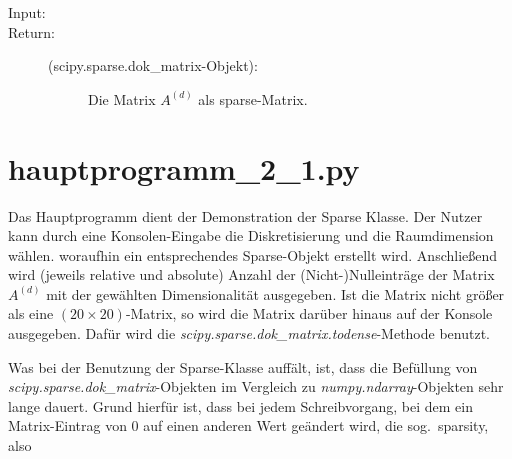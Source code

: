 \documentclass[a4paper,10pt,ngerman, openright]{sphinxmanual}
\begin{document}
\begin{fulllineitems}
\begin{fulllineitems}
\begin{description}
\item[{Input:}] \leavevmode
\item[{Return:}] \leavevmode\begin{description}
\item[{(scipy.sparse.dok\_matrix-Objekt):}] \leavevmode
Die Matrix $A^{(d)}$ als sparse-Matrix.

\end{description}

\end{description}

\end{fulllineitems}


\end{fulllineitems}

\chapter{hauptprogramm\_2\_1.py}

Das Hauptprogramm dient der Demonstration der Sparse Klasse. Der Nutzer kann durch eine Konsolen-Eingabe die Diskretisierung und die Raumdimension wählen. woraufhin ein entsprechendes Sparse-Objekt erstellt wird. Anschließend wird (jeweils relative und absolute) Anzahl der (Nicht-)Nulleinträge der Matrix $A^{(d)}$ mit der gewählten Dimensionalität ausgegeben. Ist die Matrix nicht größer als eine $(20\times20)$-Matrix, so wird die Matrix darüber hinaus auf der Konsole ausgegeben. Dafür wird die \emph{scipy.sparse.dok\_matrix.todense}-Methode benutzt.

Was bei der Benutzung der Sparse-Klasse auffält, ist, dass die Befüllung von  \emph{scipy.sparse.dok\_matrix}-Objekten im Vergleich zu \emph{numpy.ndarray}-Objekten sehr lange dauert. Grund hierfür ist, dass bei jedem Schreibvorgang, bei dem ein Matrix-Eintrag von 0 auf einen anderen Wert geändert wird, die sog.~\glqq sparsity\grqq, also %



\end{document}
